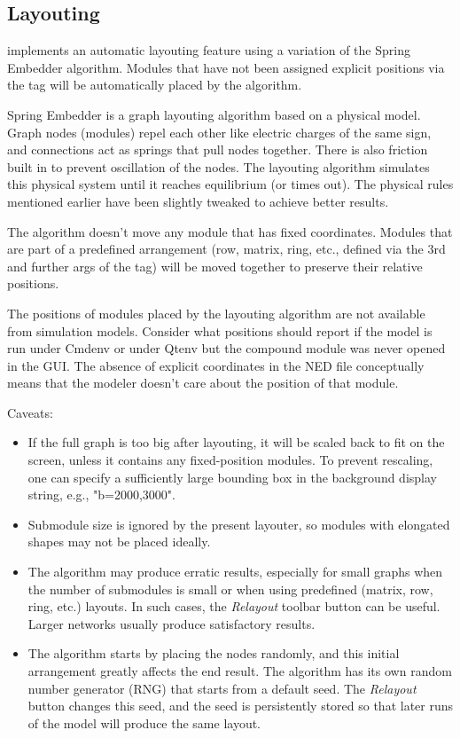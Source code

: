 \subsection{Layouting}
\label{sec:graphics:compound-module-layouting}

{\opp} implements an automatic layouting feature using a variation of the Spring
Embedder algorithm. Modules that have not been assigned explicit positions via
the  tag will be automatically placed by the algorithm.

Spring Embedder is a graph layouting algorithm based on a physical model. Graph
nodes (modules) repel each other like electric charges of the same sign, and
connections act as springs that pull nodes together. There is also friction
built in to prevent oscillation of the nodes. The layouting algorithm simulates
this physical system until it reaches equilibrium (or times out). The physical
rules mentioned earlier have been slightly tweaked to achieve better results.

The algorithm doesn't move any module that has fixed coordinates. Modules
that are part of a predefined arrangement (row, matrix, ring, etc., defined
via the 3rd and further args of the  tag) will be moved together
to preserve their relative positions.

\begin{note}
The positions of modules placed by the layouting algorithm are not available
from simulation models. Consider what positions {\opp} should report if the
model is run under Cmdenv or under Qtenv but the compound module was never
opened in the GUI. The absence of explicit coordinates in the NED file
conceptually means that the modeler doesn't care about the position of that
module.
\end{note}

Caveats:

\begin{itemize}
  \item If the full graph is too big after layouting, it will be scaled back to
    fit on the screen, unless it contains any fixed-position modules. To prevent
    rescaling, one can specify a sufficiently large bounding box in the background
    display string, e.g., "b=2000,3000".
  \item Submodule size is ignored by the present layouter, so modules with
    elongated shapes may not be placed ideally.
  \item The algorithm may produce erratic results, especially for small graphs
    when the number of submodules is small or when using predefined (matrix, row,
    ring, etc.) layouts. In such cases, the \textit{Relayout} toolbar button can
    be useful. Larger networks usually produce satisfactory results.
  \item The algorithm starts by placing the nodes randomly, and this initial
    arrangement greatly affects the end result. The algorithm has its own random
    number generator (RNG) that starts from a default seed. The \textit{Relayout}
    button changes this seed, and the seed is persistently stored so that later
    runs of the model will produce the same layout.
\end{itemize}


